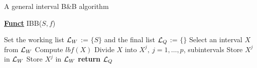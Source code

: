 \begin{algorithm}[H]
\caption{A general interval B\&B algorithm}
\label{alg:ibb}
\textbf{\underline{Funct}} IBB($S,f$)
\begin{algorithmic}[1] %
\State Set the working list ${\cal L}_W$ := $\{S\}$ and the final list ${\cal L}_Q$ := $\{\}$
 \label{alg:igoend}
	\State Select an interval $X$ from ${\cal L}_W$ \label{step:selrule}
	\State Compute $lbf(X)$ 
	 
		\State Divide $X$ into $X^j,\ j=1,\dots, p$, subintervals   
			 
				\State Store $X^j$ in ${\cal L}_W$
			\Else
				\State Store $X^j$ in ${\cal L}_W$
			\EndIf
		\EndFor
	\EndIf
\EndWhile
\State \textbf{return} ${\cal L}_Q$
\end{algorithmic}
\end{algorithm}
